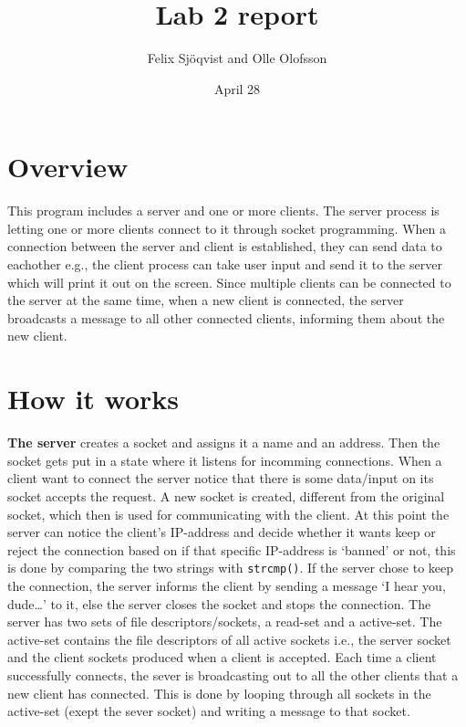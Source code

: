 \documentclass{article}
\title{Lab 2 report}
\author{Felix Sjöqvist and Olle Olofsson}
\date{April 28}
\begin{document}
\maketitle
\section{Overview}
This program includes a server and one or more clients. The server process is letting one or more clients connect to it through socket programming. When a connection between the server and client is established, they can send data to eachother e.g., the client process can take user input and send it to the server which will print it out on the screen. Since multiple clients can be connected to the server at the same time, when a new client is connected, the server broadcasts a message to all other connected clients, informing them about the new client.



\section{How it works}
\textbf{The server} creates a socket and assigns it a name and an address. Then the socket gets put in a state where it listens for incomming connections. When a client want to connect the server notice that there is some data/input on its socket accepts the request. A new socket is created, different from the original socket, which then is used for communicating with the client. At this point the server can notice the client's IP-address and decide whether it wants keep or reject the connection based on if that specific IP-address is `banned' or not, this is done by comparing the two strings with \texttt{strcmp()}. If the server chose to keep the connection, the server informs the client by sending a message `I hear you, dude\ldots' to it, else the server closes the socket and stops the connection. The server has two sets of file descriptors/sockets, a read-set and a active-set. The active-set contains the file descriptors of all active sockets i.e., the server socket and the client sockets produced when a client is accepted. Each time a client successfully connects, the sever is broadcasting out to all the other clients that a new client has connected. This is done by looping through all sockets in the active-set (exept the sever socket) and writing a message to that socket. %
\end{document}
